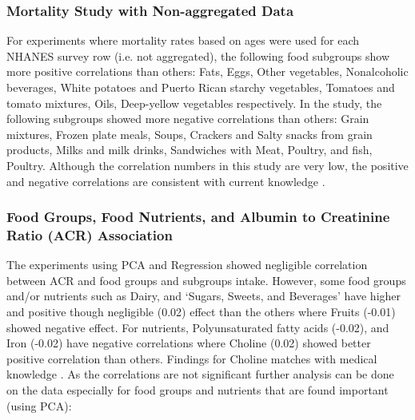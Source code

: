 \subsubsection*{Mortality Study with Non-aggregated Data}
For experiments where mortality rates based on ages were used for each NHANES survey row (i.e. not aggregated), the following food subgroups show more positive correlations than others: Fats, Eggs, Other vegetables, Nonalcoholic beverages, White potatoes and Puerto Rican starchy vegetables, Tomatoes and tomato mixtures, Oils, Deep-yellow vegetables respectively. In the study, the following subgroups showed more negative correlations than others: Grain mixtures, Frozen plate meals, Soups, Crackers and Salty snacks from grain products, Milks and milk drinks, Sandwiches with Meat, Poultry, and fish, Poultry. Although the correlation numbers in this study are very low, the positive and negative correlations are consistent with current knowledge \cite{Hsuetal2013} \cite{Fernandez-Pradoetal2017} \cite{RippeAngelopoulos2016} \cite{KaraliusShoham2013} \cite{Jaimonetal2017} \cite{Jilian2018} \cite{NKF2019} \cite{Ueharaetal2016} \cite{Nettletonetal2008} \cite{Jacobsetal2009}.

\subsubsection*{Food Groups, Food Nutrients, and Albumin to Creatinine Ratio (ACR) Association}
The experiments using PCA and Regression showed negligible correlation between ACR and food groups and subgroups intake. However, some food groups and/or nutrients such as Dairy, and  `Sugars, Sweets, and Beverages'  have higher and positive though negligible (0.02) effect than the others where Fruits (-0.01) showed negative effect.  For nutrients, Polyunsaturated fatty acids (-0.02), and Iron (-0.02) have negative correlations where Choline (0.02) showed better positive correlation than others. Findings for Choline matches with medical knowledge      \cite{Fernandez-Pradoetal2017} . As the correlations are not significant further analysis can be done on the data especially for food groups and nutrients that are found important (using PCA):

